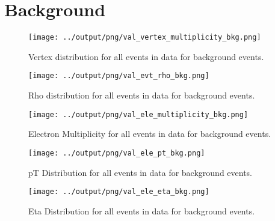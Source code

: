 \documentclass[11pt]{book}
\begin{document}
\section{Background}
\begin{figure}[htb]
\centering
\texttt{[image: ../output/png/val\_vertex\_multiplicity\_bkg.png]}
\caption{Vertex distribution for all events in data for background events.}
\label{fig:val_vertex_multiplicity_bkg}
\end{figure}

\begin{figure}[htb]
\centering
\texttt{[image: ../output/png/val\_evt\_rho\_bkg.png]}
\caption{Rho distribution for all events in data for background events.}
\label{fig:val_evt_rho_bkg}
\end{figure}

\begin{figure}[htb]
\centering
\texttt{[image: ../output/png/val\_ele\_multiplicity\_bkg.png]}
\caption{Electron Multiplicity for all events in data for background events.}
\label{fig:val_ele_multiplicity_bkg}
\end{figure}

\begin{figure}[htb]
\centering
\texttt{[image: ../output/png/val\_ele\_pt\_bkg.png]}
\caption{pT Distribution for all events in data for background events.}
\label{fig:val_ele_pt_bkg}
\end{figure}

\begin{figure}[htb]
\centering
\texttt{[image: ../output/png/val\_ele\_eta\_bkg.png]}
\caption{Eta Distribution for all events in data for background events.}
\label{fig:val_ele_eta_bkg}
\end{figure}
\clearpage
\end{document}
